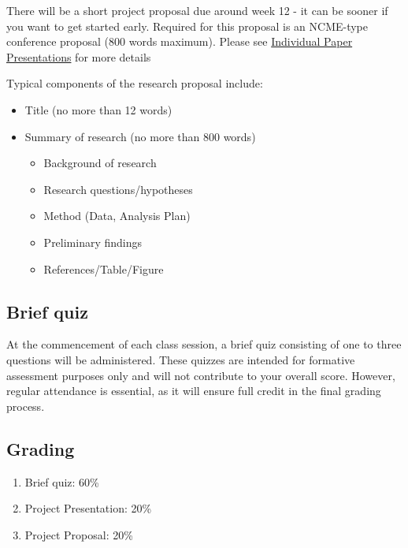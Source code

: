 \documentclass[
  letterpaper,
  DIV=11,
  numbers=noendperiod]{scrartcl}
\providecommand{\tightlist}{%
  \setlength{\itemsep}{0pt}\setlength{\parskip}{0pt}}\usepackage{longtable,booktabs,array}
\begin{document}
There will be a short project proposal due around week 12 - it can be
sooner if you want to get started early. Required for this proposal is
an NCME-type conference proposal (800 words maximum). Please see
\href{https://higherlogicdownload.s3.amazonaws.com/NCME/4b7590fc-3903-444d-b89d-c45b7fa3da3f/UploadedImages/2024_Annual_Meeting/NCME_2024_Call_for_Proposals_Final.pdf}{Individual
Paper Presentations} for more details

Typical components of the research proposal include:

\begin{itemize}
\tightlist
\item
  Title (no more than 12 words)
\item
  Summary of research (no more than 800 words)

  \begin{itemize}
  \tightlist
  \item
    Background of research
  \item
    Research questions/hypotheses
  \item
    Method (Data, Analysis Plan)
  \item
    Preliminary findings
  \item
    References/Table/Figure
  \end{itemize}
\end{itemize}

\hypertarget{brief-quiz}{%
\subsection{Brief quiz}\label{brief-quiz}}

At the commencement of each class session, a brief quiz consisting of
one to three questions will be administered. These quizzes are intended
for formative assessment purposes only and will not contribute to your
overall score. However, regular attendance is essential, as it will
ensure full credit in the final grading process.

\hypertarget{grading}{%
\subsection{Grading}\label{grading}}

\begin{enumerate}
\def\labelenumi{\arabic{enumi}.}
\tightlist
\item
  Brief quiz: 60\%
\item
  Project Presentation: 20\%
\item
  Project Proposal: 20\%
\end{enumerate}
\end{document}
